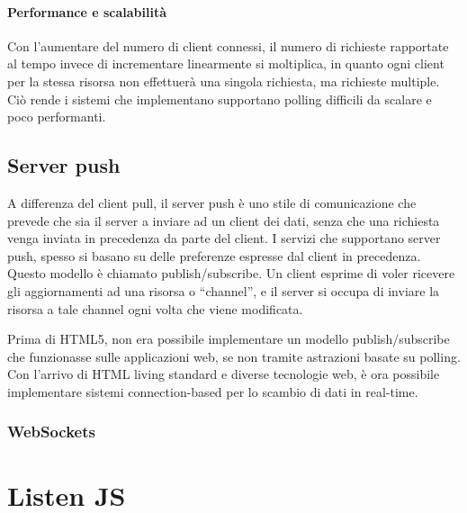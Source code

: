 \documentclass[12pt,a4paper,openright]{report}
\begin{document}
\subsubsection{Performance e scalabilità}
Con l’aumentare del numero di client connessi, il numero di richieste rapportate al tempo invece di incrementare linearmente si moltiplica, in quanto ogni client per la stessa risorsa non effettuerà una singola richiesta, ma richieste multiple. Ciò rende i sistemi che implementano supportano polling difficili da scalare e poco performanti.

\section{Server push}\label{sec_serverpush}
A differenza del client pull, il server push è uno stile di comunicazione che prevede che sia il server a inviare ad un client dei dati, senza che una richiesta venga inviata in precedenza da parte del client. I servizi che supportano server push, spesso si basano su delle preferenze espresse dal client in precedenza. Questo modello è chiamato publish/subscribe. Un client esprime di voler ricevere gli aggiornamenti ad una risorsa o “channel”, e il server si occupa di inviare la risorsa a tale channel ogni volta che viene modificata.

\bigskip

Prima di HTML5, non era possibile implementare un modello publish/subscribe che funzionasse sulle applicazioni web, se non tramite astrazioni basate su polling. Con l’arrivo di HTML living standard e diverse tecnologie web, è ora possibile implementare sistemi connection-based per lo scambio di dati in real-time.

\subsection{WebSockets}

\chapter{Listen JS}

\end{document}
